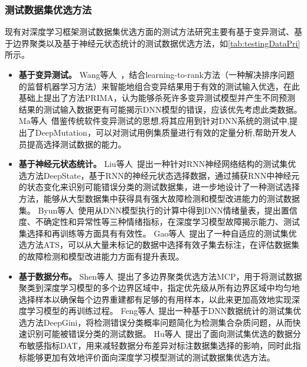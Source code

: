 \subsubsection{测试数据集优选方法}

现有对深度学习框架测试数据集优选方面的测试方法研究主要有基于变异测试、基于边界聚类以及基于神经元状态统计的测试数据优选方法，如\cref{tab:testingDataPri}所示。

\begin{itemize}

	\item \textbf{基于变异测试。}
	      Wang等人~，结合learning-to-rank方法（一种解决排序问题的监督机器学习方法）来智能地组合变异结果用于有效的测试输入优选，在此基础上提出了方法PRIMA，认为能够杀死许多变异测试模型并产生不同预测结果的测试输入数据更有可能揭示DNN模型的错误，应该优先考虑此类数据。
	      Ma等人~借鉴传统软件变异测试的思想,将其应用到针对DNN系统的测试中,提出了DeepMutation，可以对测试用例集质量进行有效的定量分析,帮助开发人员提高选择测试数据的能力。

	\item \textbf{基于神经元状态统计。}
	      Liu等人~提出一种针对RNN神经网络结构的测试集优选方法DeepState，基于RNN的神经元状态选择数据，通过捕获RNN中神经元的状态变化来识别可能错误分类的测试数据集，进一步地设计了一种测试选择方法，能够从大型数据集中获得具有强大故障检测和模型改进能力的测试数据集。
	      Byun等人~使用从DNN模型执行的计算中得到DNN情绪量表，提出置信度、不确定性和异常性等三种情绪指标，在深度学习模型故障揭示能力、测试集选择和再训练等方面具有有效性。
	      Gao等人~提出了一种自适应的测试集优选方法ATS，可以从大量未标记的数据中选择有效子集去标注，在评估数据集的故障检测和模型改进能力方面有提升表现。

	\item \textbf{基于数据分布。}
	      Shen等人~提出了多边界聚类优选方法MCP，用于将测试数据聚类到深度学习模型的多个边界区域中，指定优先级从所有边界区域中均匀地选择样本以确保每个边界重建都有足够的有用样本，以此来更加高效地实现深度学习模型的再训练过程。
	      Feng等人~提出一种基于DNN数据统计的测试集优选方法DeepGini，将检测错误分类概率问题简化为检测集合杂质问题，从而快速识别可能被错误分类的测试数据。
	      Hu等人~提出了面向测试集优选的数据分布敏感指标DAT，用来减轻数据分布差异对标注数据集选择的影响，同时此指标能够更加有效地评价面向深度学习模型测试的测试数据集优选方法。

\end{itemize}

